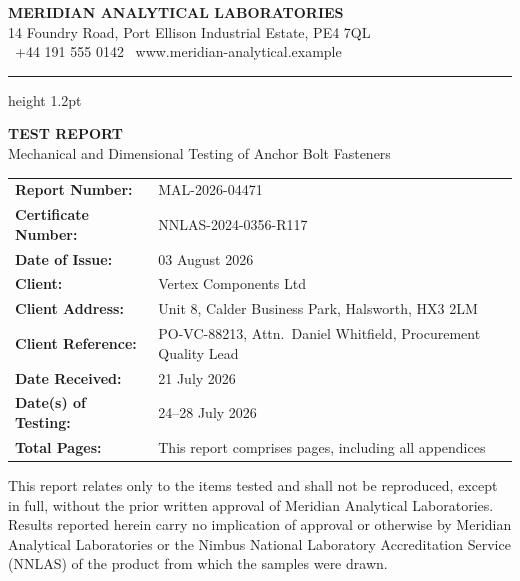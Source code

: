 \begin{minipage}[c]{0.74\textwidth}
  {\large\bfseries\color{labnavy}MERIDIAN ANALYTICAL LABORATORIES}\\[2pt]
  {\small\color{labgray}14 Foundry Road, Port Ellison Industrial Estate, PE4 7QL}\\
  {\small\color{labgray}\faPhone\ +44 191 555 0142 \quad \faGlobe\ www.meridian-analytical.example}
\end{minipage}%
\hfill
\begin{minipage}[c]{0.22\textwidth}
  \centering
  \accreditationseal
\end{minipage}
\par
\vspace{0.4em}
{\color{labline}\hrule height 1.2pt}
\vspace{1.2em}

\begin{center}
  {\LARGE\bfseries\color{labnavy}TEST REPORT}\\[4pt]
  {\normalsize\color{labteal}Mechanical and Dimensional Testing of Anchor Bolt Fasteners}
\end{center}

\vspace{1em}

\begin{tabularx}{\linewidth}{@{}p{4.7cm}X@{}}
\textbf{\color{labnavy}Report Number:} & MAL-2026-04471 \\
\textbf{\color{labnavy}Certificate Number:} & NNLAS-2024-0356-R117 \\
\textbf{\color{labnavy}Date of Issue:} & 03 August 2026 \\
\textbf{\color{labnavy}Client:} & Vertex Components Ltd \\
\textbf{\color{labnavy}Client Address:} & Unit 8, Calder Business Park, Halsworth, HX3 2LM \\
\textbf{\color{labnavy}Client Reference:} & PO-VC-88213, Attn.\ Daniel Whitfield, Procurement Quality Lead \\
\textbf{\color{labnavy}Date Received:} & 21 July 2026 \\
\textbf{\color{labnavy}Date(s) of Testing:} & 24--28 July 2026 \\
\textbf{\color{labnavy}Total Pages:} & This report comprises \pageref{LastPage} pages, including all appendices \\
\end{tabularx}

\vspace{1em}

\begin{tcolorbox}[notebox]
\small
This report relates only to the items tested and shall not be reproduced, except in full, without
the prior written approval of Meridian Analytical Laboratories. Results reported herein carry no
implication of approval or otherwise by Meridian Analytical Laboratories or the Nimbus National
Laboratory Accreditation Service (NNLAS) of the product from which the samples were drawn.
\end{tcolorbox}
